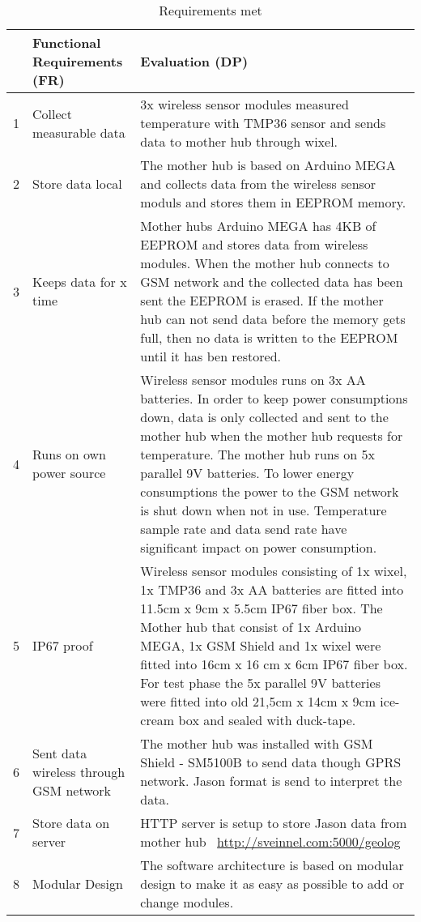  \begin{table}[H]
 	\caption{Requirements met}
 	\label{tbl:FR-Eva}
 	\begin{tabular}{|l|p{4cm}| p{} |}
 		
 		\hline
 		& \textbf{Functional Requirements (FR)}  & \textbf{Evaluation (DP)} \\  
 		\hline 1 &  Collect measurable data & 3x wireless sensor modules measured temperature with  TMP36 \cite{Devices2010} sensor and sends data to mother hub through wixel. \\ 
 		           		
 		\hline 2 & Store data local &   The mother hub is based on Arduino MEGA and collects data from the wireless sensor moduls and stores them in EEPROM memory. \\
 	
 		\hline 3 & Keeps data for x time &  Mother hubs Arduino MEGA \cite{arduinoMega} has 4KB of EEPROM and stores  data from wireless modules. When the mother hub connects to GSM network and the collected data has been sent the EEPROM is erased. If the mother hub can not send data before the memory gets full, then no data is written to the EEPROM until it has ben restored.  \\
 	
 		\hline 4 & Runs on own power source & Wireless sensor modules runs on 3x AA batteries. In order to keep power consumptions down, data is only collected and sent to the mother hub when the mother hub requests for temperature. The mother hub runs on 5x parallel 9V batteries.  To lower energy consumptions the power to the GSM network is shut down when not in use. Temperature sample rate and data send rate have significant impact on power consumption. \\ 
 	
 		\hline 5 & IP67 proof &   Wireless sensor modules consisting of 1x wixel, 1x TMP36 and 3x AA batteries are fitted into 11.5cm x 9cm x 5.5cm IP67 fiber box. The Mother hub that consist of 1x Arduino MEGA, 1x GSM Shield and 1x wixel were fitted into 16cm x 16 cm x 6cm IP67 fiber box. For test phase the 5x parallel 9V batteries were fitted into old 21,5cm x 14cm x 9cm ice-cream box and sealed with duck-tape. \\
 	
 		\hline 6 & Sent data wireless through GSM network & The mother hub was installed with GSM Shield - SM5100B \cite{Sparkfun2014} to send data though GPRS network. Jason format is send to interpret the data. \\ 
 	
 		\hline 7 & Store data on server & HTTP server is setup to store Jason data from mother hub ~\url{http://sveinnel.com:5000/geolog} \\ 
 	
 		\hline 8 & Modular Design & The software architecture is based on modular design to make it as easy as possible to add or change modules.  \\
 		\hline
 	\end{tabular}
 \end{table}


